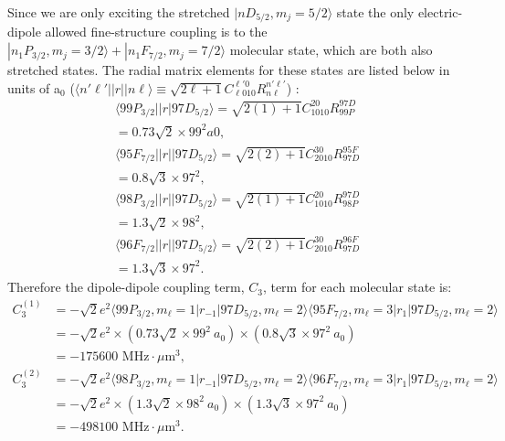 Since we are only exciting the stretched $|nD_{5/2},m_j=5/2\rangle$ state the only electric-dipole allowed fine-structure coupling is to the $|n_1P_{3/2},m_j=3/2\rangle + |n_1F_{7/2},m_j=7/2\rangle$ molecular state, which are both also stretched states.
The radial matrix elements for these states are listed below in units of a${_0}$ ($\langle n'\ell '||r||n\ell\rangle \equiv \sqrt{2\ell +1}C^{\ell '0}_{\ell 010}R^{n'\ell '}_{n\ell}$) \cite{WS2007}:
\begin{subequations}
  \label{eq_dradmatelem}
  \begin{align}
  \langle 99P_{3/2}||r|97D_{5/2} \rangle
	=\sqrt{2(1)+1}C^{20}_{1010}R^{97D}_{99P}\\
	=0.73\sqrt{2}\times 99^2 a0,\\
    \langle 95F_{7/2}||r||97D_{5/2} \rangle
	=\sqrt{2(2)+1}C^{30}_{2010}R^{95F}_{97D}\\
	=0.8\sqrt{3}\times 97^2,\\
    \langle 98P_{3/2}||r||97D_{5/2} \rangle
	=\sqrt{2(1)+1}C^{20}_{1010}R^{97D}_{98P}\\
	= 1.3\sqrt{2}\times 98^2,\\
    \langle 96F_{7/2}||r||97D_{5/2}\rangle
	=\sqrt{2(2)+1}C^{30}_{2010}R^{96F}_{97D}\\
	= 1.3\sqrt{3}\times 97^2.
  \end{align}
\end{subequations}
Therefore the dipole-dipole coupling term, $C_3$, term for each molecular state is:
\begin{equation}
  \label{eq_dc3s}
  \begin{split}
    C_3^{(1)}
      &= -\sqrt{2}e^2 \langle 99P_{3/2}, m_{\ell}=1|r_{-1}|97D_{5/2}, m_{\ell}=2\rangle \langle 95F_{7/2}, m_{\ell}=3|r_1|97D_{5/2}, m_{\ell}=2\rangle\\
      &= -\sqrt{2}e^2 \times (0.73\sqrt{2}\times 99^2 \ a_0) \times (0.8\sqrt{3}\times 97^2 \ a_0) \\
      &=-175600 \text{ MHz} \cdot \mu \text{m}^3,\\
    C_3^{(2)}
      &= -\sqrt{2}e^2 \langle 98P_{3/2},m_{\ell}=1|r_{-1}|97D_{5/2},m_{\ell}=2\rangle \langle 96F_{7/2},m_{\ell}=3|r_1|97D_{5/2},m_{\ell}=2\rangle\\
      &= -\sqrt{2}e^2 \times (1.3\sqrt{2}\times 98^2 \ a_0) \times (1.3\sqrt{3}\times 97^2 \ a_0) \\
      &=-498100 \text{ MHz} \cdot \mu \text{m}^3.
  \end{split}
\end{equation}

